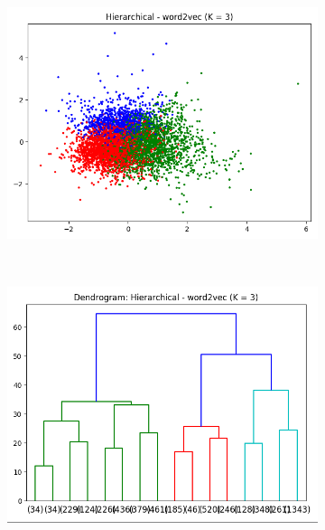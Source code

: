 \documentclass[11pt]{article}
\begin{document}
\begin{itemize}
\begin{figure}[H]
\begin{center}
\begin{subfigure}{0.4\textwidth}
\includegraphics[width=\textwidth]{pics/hier_w2v.png}
\caption{}
\end{subfigure}
~
\begin{subfigure}{0.4\textwidth}
\includegraphics[width=\textwidth]{pics/dendro_w2v.png}
\caption{}
\end{subfigure}
\end{center}
\end{figure}

\end{itemize}
\end{document}
